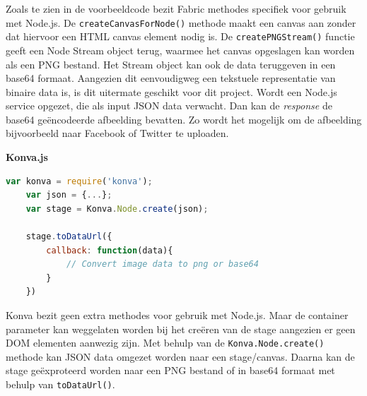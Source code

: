 Zoals te zien in de voorbeeldcode bezit Fabric methodes specifiek voor gebruik met Node.js. De \texttt{createCanvasForNode()} methode maakt een canvas aan zonder dat hiervoor een HTML canvas element nodig is. De \texttt{createPNGStream()} functie geeft een Node Stream object terug, waarmee het canvas opgeslagen kan worden als een PNG bestand. Het Stream object kan ook de data teruggeven in een base64 formaat. Aangezien dit eenvoudigweg een tekstuele representatie van binaire data is, is dit uitermate geschikt voor dit project. Wordt een Node.js service opgezet, die als input JSON data verwacht. Dan kan de \textit{response} de base64 ge\"{e}ncodeerde afbeelding bevatten. Zo wordt het mogelijk om de afbeelding bijvoorbeeld naar Facebook of Twitter te uploaden. 


\textbf{Konva.js}
\begin{lstlisting}[language=javascript]
	var konva = require('konva');
	var json = {...};
	var stage = Konva.Node.create(json);
	
	stage.toDataUrl({
		callback: function(data){
			// Convert image data to png or base64 
		}
	})
\end{lstlisting} %
Konva bezit geen extra methodes voor gebruik met Node.js. Maar de container parameter kan weggelaten worden bij het cre\"{e}ren van de stage aangezien er geen DOM elementen aanwezig zijn. Met behulp van de \texttt{Konva.Node.create()} methode kan JSON data omgezet worden naar een stage/canvas. Daarna kan de stage ge\"{e}xproteerd worden naar een PNG bestand of in base64 formaat met behulp van \texttt{toDataUrl()}. 

